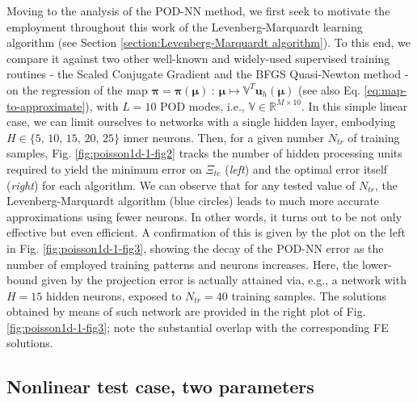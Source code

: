 \documentclass[12pt, a4paper, twoside, openright, notitlepage]{report}
\numberwithin{equation}{chapter}
\theoremstyle{theorem}
\theoremstyle{definition}
\theoremstyle{remark}
\theoremstyle{proposition}
\numberwithin{figure}{chapter}
\newcommand{\bg}[1]{\boldsymbol{#1}}
\begin{document}
		Moving to the analysis of the POD-NN method, we first seek to motivate the employment throughout this work of the Levenberg-Marquardt learning algorithm (see Section \ref{section:Levenberg-Marquardt algorithm}). To this end, we compare it against two other well-known and widely-used supervised training routines - the Scaled Conjugate Gradient \cite{Mol93} and the BFGS Quasi-Newton method \cite{GMW81} - on the regression of the map $\bg{\pi} = \bg{\pi}(\bg{\mu}) ~ : ~ \bg{\mu} \mapsto \mathbb{V}^T \mathbf{u}_h(\bg{\mu})$ (see also Eq. \eqref{eq:map-to-approximate}), with $L = 10$ POD modes, i.e., $\mathbb{V} \in \mathbb{R}^{M \times 10}$. In this simple linear case, we can limit ourselves to networks with a single hidden layer, embodying $H \in \big\lbrace 5, \, 10, \, 15, \, 20, \, 25 \big\rbrace$ inner neurons. Then, for a given number $N_{tr}$ of training samples, Fig. \ref{fig:poisson1d-1-fig2} tracks the number of hidden processing units required to yield the minimum error on $\Xi_{te}$ (\emph{left}) and the optimal error itself (\emph{right}) for each algorithm. We can observe that for any tested value of $N_{tr}$, the Levenberg-Marquardt algorithm (blue circles) leads to much more accurate approximations using fewer neurons. In other words, it turns out to be not only effective but even efficient. A confirmation of this is given by the plot on the left in Fig. \ref{fig:poisson1d-1-fig3}, showing the decay of the POD-NN error as the number of employed training patterns and neurons increases. Here, the lower-bound given by the projection error is actually attained via, e.g., a network with $H = 15$ hidden neurons, exposed to $N_{tr} = 40$ training samples. The solutions obtained by means of such network are provided in the right plot of Fig. \ref{fig:poisson1d-1-fig3}; note the substantial overlap with the corresponding FE solutions. 
				
	\subsection{Nonlinear test case, two parameters}
	\label{section:poisson1d-2}
	
\end{document}
